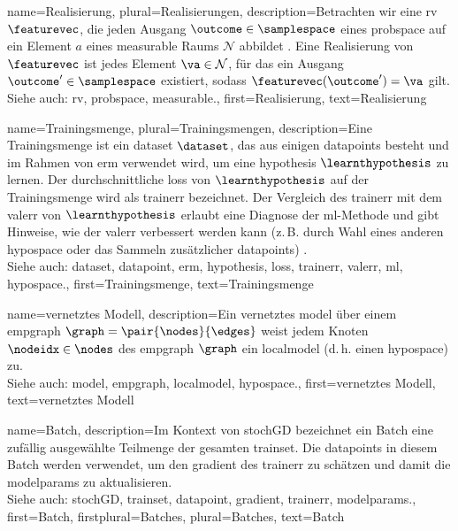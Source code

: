 {{{{
{name={Realisierung}, plural={Realisierungen},
description={Betrachten wir eine \gls{rv} $\featurevec$, die jeden Ausgang 
$\outcome \in \samplespace$ eines \gls{probspace} auf ein Element $a$ eines \gls{measurable} Raums $\mathcal{N}$ abbildet \cite{RudinBookPrinciplesMatheAnalysis, BillingsleyProbMeasure, HalmosMeasure}. 
Eine Realisierung von $\featurevec$ ist jedes Element $\va \in \mathcal{N}$, für das ein Ausgang $\outcome' \in \samplespace$ existiert, sodass $\featurevec(\outcome') = \va$ gilt.
\\
Siehe auch: \gls{rv}, \gls{probspace}, \gls{measurable}.}, 
first={Realisierung},
text={Realisierung}  
}

{name={Trainingsmenge}, plural={Trainingsmengen},
description={Eine Trainingsmenge ist ein \gls{dataset} $\dataset$, das aus einigen \glspl{datapoint} besteht und 
im Rahmen von \gls{erm} verwendet wird, um eine \gls{hypothesis} $\learnthypothesis$ zu lernen. Der durchschnittliche \gls{loss}
 von $\learnthypothesis$ auf der Trainingsmenge wird als \gls{trainerr} bezeichnet. Der Vergleich des \gls{trainerr} mit dem \gls{valerr}
von $\learnthypothesis$ erlaubt eine Diagnose der \gls{ml}-Methode und gibt Hinweise, wie der \gls{valerr} verbessert werden kann (z.\,B. durch
 Wahl eines anderen \gls{hypospace} oder das Sammeln zusätzlicher \glspl{datapoint}) \cite[Sec. 6.6]{MLBasics}.
\\
Siehe auch: \gls{dataset}, \gls{datapoint}, \gls{erm}, \gls{hypothesis}, \gls{loss}, \gls{trainerr}, \gls{valerr}, \gls{ml}, \gls{hypospace}.},
first={Trainingsmenge},
text={Trainingsmenge}  
}

{name={vernetztes Modell},
description={Ein vernetztes \gls{model} über einem \gls{empgraph} $\graph = \pair{\nodes}{\edges}$ weist 
jedem Knoten $\nodeidx \in \nodes$ des \gls{empgraph} $\graph$ ein \gls{localmodel} (d.\,h. einen \gls{hypospace}) zu.
\\
Siehe auch: \gls{model}, \gls{empgraph}, \gls{localmodel}, \gls{hypospace}.}, 
first={vernetztes Modell},
text={vernetztes Modell}  
}

{name={Batch},
description={Im Kontext von \gls{stochGD} bezeichnet ein Batch eine zufällig ausgewählte Teilmenge 
der gesamten \gls{trainset}. Die \glspl{datapoint} in diesem Batch werden verwendet, um den \gls{gradient} des
 \gls{trainerr} zu schätzen und damit die \glspl{modelparam} zu aktualisieren.
\\
Siehe auch: \gls{stochGD}, \gls{trainset}, \gls{datapoint}, \gls{gradient}, \gls{trainerr}, \glspl{modelparam}.}, 
first={Batch},
firstplural={Batches}, 
plural={Batches}, 
text={Batch}  
}

}}}}
